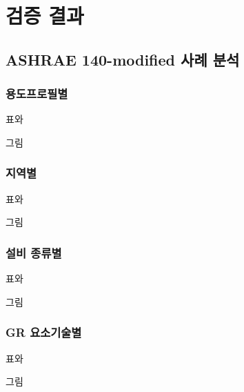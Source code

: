 
\part{검증 결과}
\label{part:algorithm}


\chapter{ASHRAE 140-modified 사례 분석}

\section{용도프로필별}
표와\par
그림

\section{지역별}
표와\par
그림

\section{설비 종류별}
표와\par
그림

\section{GR 요소기술별}
표와\par
그림